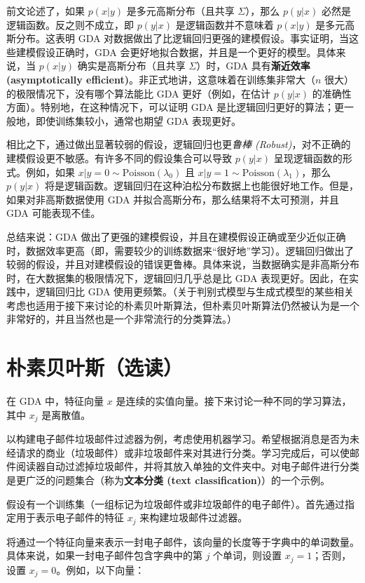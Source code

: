 前文论述了，如果 $p(x|y)$ 是多元高斯分布（且共享 $\Sigma$），那么 $p(y|x)$ 必然是逻辑函数。反之则不成立，即 $p(y|x)$ 是逻辑函数并不意味着 $p(x|y)$ 是多元高斯分布。这表明 GDA 对数据做出了比逻辑回归更强的建模假设。事实证明，当这些建模假设正确时，GDA 会更好地拟合数据，并且是一个更好的模型。具体来说，当 $p(x|y)$ 确实是高斯分布（且共享 $\Sigma$）时，GDA 具有\textbf{渐近效率 (asymptotically efficient)}。非正式地讲，这意味着在训练集非常大（$n$ 很大）的极限情况下，没有哪个算法能比 GDA 更好（例如，在估计 $p(y|x)$ 的准确性方面）。特别地，在这种情况下，可以证明 GDA 是比逻辑回归更好的算法；更一般地，即使训练集较小，通常也期望 GDA 表现更好。

相比之下，通过做出显著较弱的假设，逻辑回归也更\textit{鲁棒 (Robust)}，对不正确的建模假设更不敏感。有许多不同的假设集合可以导致 $p(y|x)$ 呈现逻辑函数的形式。例如，如果 $x|y=0 \sim \text{Poisson}(\lambda_0)$ 且 $x|y=1 \sim \text{Poisson}(\lambda_1)$，那么 $p(y|x)$ 将是逻辑函数。逻辑回归在这种泊松分布数据上也能很好地工作。但是，如果对非高斯数据使用 GDA 并拟合高斯分布，那么结果将不太可预测，并且 GDA 可能表现不佳。

总结来说：GDA 做出了更强的建模假设，并且在建模假设正确或至少近似正确时，数据效率更高（即，需要较少的训练数据来“很好地”学习）。逻辑回归做出了较弱的假设，并且对建模假设的错误更鲁棒。具体来说，当数据确实是非高斯分布时，在大数据集的极限情况下，逻辑回归几乎总是比 GDA 表现更好。因此，在实践中，逻辑回归比 GDA 使用更频繁。（关于判别式模型与生成式模型的某些相关考虑也适用于接下来讨论的朴素贝叶斯算法，但朴素贝叶斯算法仍然被认为是一个非常好的，并且当然也是一个非常流行的分类算法。）

\section{朴素贝叶斯（选读）}

在 GDA 中，特征向量 $x$ 是连续的实值向量。接下来讨论一种不同的学习算法，其中 $x_j$ 是离散值。

以构建电子邮件垃圾邮件过滤器为例，考虑使用机器学习。希望根据消息是否为未经请求的商业（垃圾邮件）或非垃圾邮件来对其进行分类。学习完成后，可以使邮件阅读器自动过滤掉垃圾邮件，并将其放入单独的文件夹中。对电子邮件进行分类是更广泛的问题集合（称为\textbf{文本分类 (text classification)}）的一个示例。

假设有一个训练集（一组标记为垃圾邮件或非垃圾邮件的电子邮件）。首先通过指定用于表示电子邮件的特征 $x_j$ 来构建垃圾邮件过滤器。

将通过一个特征向量来表示一封电子邮件，该向量的长度等于字典中的单词数量。具体来说，如果一封电子邮件包含字典中的第 $j$ 个单词，则设置 $x_j=1$；否则，设置 $x_j=0$。例如，以下向量：


